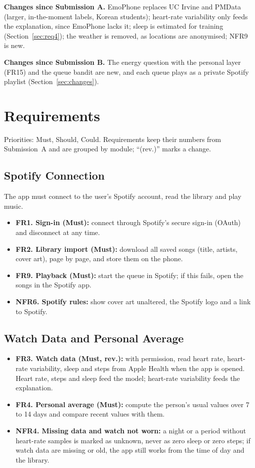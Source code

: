\documentclass[conference]{IEEEtran}
\begin{document}
\textbf{Changes since Submission A.} EmoPhone replaces UC Irvine and PMData (larger, in-the-moment labels, Korean students); heart-rate variability only feeds the explanation, since EmoPhone lacks it; sleep is estimated for training (Section~\ref{sec:req4}); the weather is removed, as locations are anonymised; NFR9 is new.

\textbf{Changes since Submission B.} The energy question with the personal layer (FR15) and the queue bandit are new, and each queue plays as a private Spotify playlist (Section~\ref{sec:changes}).

\section{Requirements}\label{sec:req}
Priorities: Must, Should, Could. Requirements keep their numbers from Submission~A and are grouped by module; ``(rev.)'' marks a change.

\subsection{Spotify Connection}
The app must connect to the user's Spotify account, read the library and play music.
\begin{itemize}
\item \textbf{FR1. Sign-in (Must):} connect through Spotify's secure sign-in (OAuth) and disconnect at any time.
\item \textbf{FR2. Library import (Must):} download all saved songs (title, artists, cover art), page by page, and store them on the phone.
\item \textbf{FR9. Playback (Must):} start the queue in Spotify; if this fails, open the songs in the Spotify app.
\item \textbf{NFR6. Spotify rules:} show cover art unaltered, the Spotify logo and a link to Spotify.
\end{itemize}

\subsection{Watch Data and Personal Average}
\begin{itemize}
\item \textbf{FR3. Watch data (Must, rev.):} with permission, read heart rate, heart-rate variability, sleep and steps from Apple Health when the app is opened. Heart rate, steps and sleep feed the model; heart-rate variability feeds the explanation.
\item \textbf{FR4. Personal average (Must):} compute the person's usual values over 7 to 14 days and compare recent values with them.
\item \textbf{NFR4. Missing data and watch not worn:} a night or a period without heart-rate samples is marked as unknown, never as zero sleep or zero steps; if watch data are missing or old, the app still works from the time of day and the library.
\end{itemize}
\end{document}
